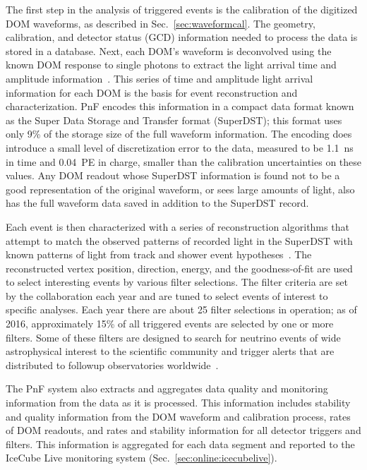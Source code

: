 The first step in the analysis of triggered events is the calibration of
the digitized DOM waveforms, as described in Sec.~\ref{sec:waveformcal}.
The geometry, calibration, and detector status (GCD) information needed to
process the data is stored in a database.  Next, each DOM's waveform is
deconvolved using the known DOM response to single photons to 
extract the light arrival time and amplitude information~\cite{IC3:ereco}.
This series of time and amplitude light arrival information for each DOM is
the basis for event reconstruction and characterization.  PnF encodes this
information in a compact data format known as the Super Data
Storage and Transfer format (SuperDST); this format uses only 9\% of the storage
size of the full waveform information.  The encoding does introduce a
small level of discretization error to the data, measured to be 1.1~ns in time and
0.04~PE in charge, smaller than the calibration uncertainties on these
values.  Any DOM readout whose SuperDST information is found not to be a
good representation of the original waveform, or sees large amounts of
light, also has the full waveform data saved in addition to the
SuperDST record.


Each event is then characterized with a series of reconstruction
algorithms that attempt to match the observed patterns of recorded light in
the SuperDST with known patterns of light from track and shower event
hypotheses~\cite{IC3:ereco}.  The reconstructed vertex position, direction,
energy, and the goodness-of-fit are used to select interesting events by various
filter selections.  The filter criteria are set by the collaboration
each year and are tuned to select events of interest to specific
analyses.  Each year there are about 25 filter selections in
operation; as of 2016, approximately 15\% of all triggered events are
selected by one or more filters.  Some of these filters are designed to search for
neutrino events of wide astrophysical interest to the scientific community
and trigger alerts that are distributed to followup observatories
worldwide~\cite{Abbasi:2011ja,Aartsen:2015trq}.

The PnF system also extracts and aggregates data quality and monitoring
information from the data as it is processed.  This information includes
stability and quality information from the DOM waveform and calibration
process, rates of DOM readouts, and rates and 
stability information for all detector triggers and filters.  This
information is aggregated for each data segment and reported to the IceCube
Live monitoring system (Sec.~\ref{sec:online:icecubelive}).

